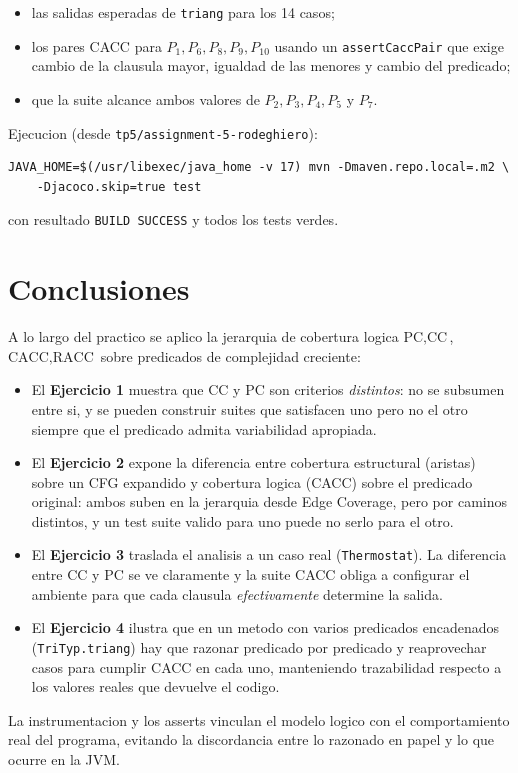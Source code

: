 \documentclass[12pt,a4paper]{article}
\begin{document}
\begin{itemize}
  \item las salidas esperadas de \texttt{triang} para los 14 casos;
  \item los pares CACC para $P_1, P_6, P_8, P_9, P_{10}$ usando un \texttt{assertCaccPair} que
  exige cambio de la clausula mayor, igualdad de las menores y cambio del predicado;
  \item que la suite alcance ambos valores de $P_2, P_3, P_4, P_5$ y $P_7$.
\end{itemize}

Ejecucion (desde \texttt{tp5/assignment-5-rodeghiero}):

\begin{lstlisting}[style=codestyle]
JAVA_HOME=$(/usr/libexec/java_home -v 17) mvn -Dmaven.repo.local=.m2 \
    -Djacoco.skip=true test
\end{lstlisting}

con resultado \texttt{BUILD SUCCESS} y todos los tests verdes.

\section*{Conclusiones}

A lo largo del practico se aplico la jerarquia de cobertura logica $\text{PC},\text{CC}$,
$\text{CACC},\text{RACC}$ sobre predicados de complejidad creciente:

\begin{itemize}
  \item El \textbf{Ejercicio 1} muestra que CC y PC son criterios \emph{distintos}: no se
  subsumen entre si, y se pueden construir suites que satisfacen uno pero no el otro siempre
  que el predicado admita variabilidad apropiada.
  \item El \textbf{Ejercicio 2} expone la diferencia entre cobertura estructural (aristas) sobre
  un CFG expandido y cobertura logica (CACC) sobre el predicado original: ambos suben en la
  jerarquia desde Edge Coverage, pero por caminos distintos, y un test suite valido para uno
  puede no serlo para el otro.
  \item El \textbf{Ejercicio 3} traslada el analisis a un caso real (\texttt{Thermostat}). La
  diferencia entre CC y PC se ve claramente y la suite CACC obliga a configurar el ambiente
  para que cada clausula \emph{efectivamente} determine la salida.
  \item El \textbf{Ejercicio 4} ilustra que en un metodo con varios predicados encadenados
  (\texttt{TriTyp.triang}) hay que razonar predicado por predicado y reaprovechar casos para
  cumplir CACC en cada uno, manteniendo trazabilidad respecto a los valores reales que devuelve
  el codigo.
\end{itemize}

La instrumentacion y los asserts vinculan el modelo logico con el comportamiento real del
programa, evitando la discordancia entre lo razonado en papel y lo que ocurre en la JVM.
\end{document}
